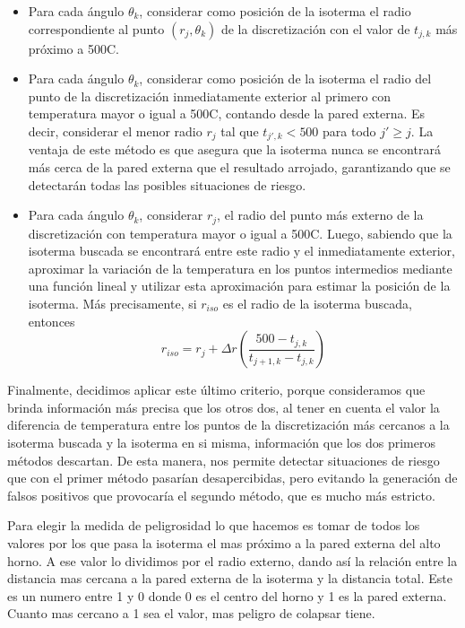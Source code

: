     \begin{itemize}
      \item Para cada ángulo $\theta_k$, considerar como posición de la isoterma el radio correspondiente al punto $(r_j, \theta_k)$ de la discretización con el valor de $t_{j,k}$ más próximo a 500{\degree}C.
      \item Para cada ángulo $\theta_k$, considerar como posición de la isoterma el radio del punto de la discretización inmediatamente exterior al primero con temperatura mayor o igual a 500{\degree}C, contando desde la pared externa. Es decir, considerar el menor radio $r_j$ tal que $t_{j',k} < 500$ para todo $j' \geq j$. La ventaja de este método es que asegura que la isoterma nunca se encontrará más cerca de la pared externa que el resultado arrojado, garantizando que se detectarán todas las posibles situaciones de riesgo.
      \item Para cada ángulo $\theta_k$, considerar $r_j$, el radio del punto más externo de la discretización con temperatura mayor o igual a 500{\degree}C. Luego, sabiendo que la isoterma buscada se encontrará entre este radio y el inmediatamente exterior, aproximar la variación de la temperatura en los puntos intermedios mediante una función lineal y utilizar esta aproximación para estimar la posición de la isoterma. Más precisamente, si $r_{iso}$ es el radio de la isoterma buscada, entonces
        \[ r_{iso} = r_j + \Delta r \left(\frac{500 - t_{j,k}}{t_{j+1,k} - t_{j,k}} \right) \]
    \end{itemize}

    Finalmente, decidimos aplicar este último criterio, porque consideramos que brinda información más precisa que los otros dos, al tener en cuenta el valor la diferencia de temperatura entre los puntos de la discretización más cercanos a la isoterma buscada y la isoterma en si misma, información que los dos primeros métodos descartan. De esta manera, nos permite detectar situaciones de riesgo que con el primer método pasarían desapercibidas, pero evitando la generación de falsos positivos que provocaría el segundo método, que es mucho más estricto.

    Para elegir la medida de peligrosidad lo que hacemos es tomar de todos los valores por los que pasa la isoterma el mas próximo a la pared externa del alto horno. A ese valor lo dividimos por el radio externo, dando así la relación entre la distancia mas cercana a la pared externa de la isoterma y la distancia total.
    Este es un numero entre 1 y 0 donde 0 es el centro del horno y 1 es la pared externa. Cuanto mas cercano a 1 sea el valor, mas peligro de colapsar tiene. 

